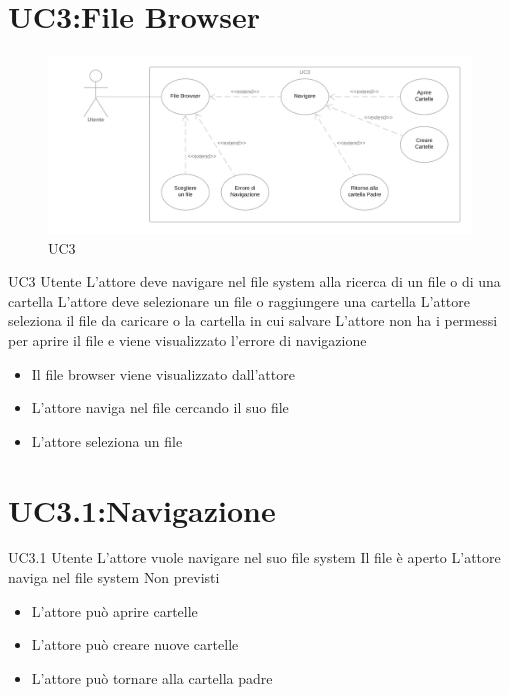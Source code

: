 \documentclass[../AnalisideiRequisiti.tex]{subfiles}
\begin{document}
	\section{UC3:File Browser}
	\begin{figure}[H]
		\caption{UC3}
		\centering
		\includegraphics[width=\textwidth]{../img/UC03.png}
	\end{figure}
	\UserCase
	{UC3}
	{Utente}
	{}
	{L'attore deve navigare nel file system alla ricerca di un file o di una cartella}
	{L'attore deve selezionare un file o raggiungere una cartella}
	{L'attore seleziona il file da caricare o la cartella in cui salvare}
	{L'attore non ha i permessi per aprire il file e viene visualizzato l'errore di navigazione }
	{
		\begin{itemize}
			\item{} Il file browser viene visualizzato dall'attore
			\item{} L'attore naviga nel file  cercando il suo file 
			\item{} L'attore seleziona un file 
		\end{itemize}
	}
	\section{UC3.1:Navigazione}
	\UserCase
	{UC3.1}
	{Utente}
	{}
	{L'attore vuole navigare nel suo file system}
	{Il file  è aperto}
	{L'attore naviga nel file system}
	{Non previsti}
	{
		\begin{itemize}
			\item{} L'attore può aprire cartelle 
			\item{} L'attore può creare nuove cartelle 
			\item{} L'attore può tornare alla cartella padre 
		\end{itemize}
	}	
\end{document}
